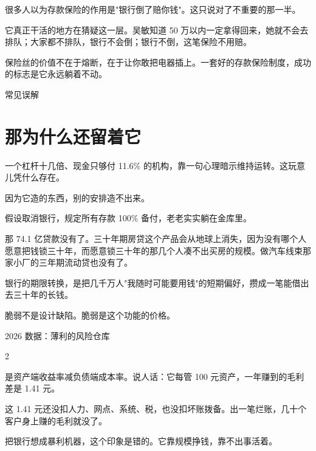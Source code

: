 很多人以为存款保险的作用是"银行倒了赔你钱"。这只说对了不重要的那一半。

它真正干活的地方在猜疑这一层。吴敏知道 50 万以内一定拿得回来，她就不会去排队；大家都不排队，银行不会倒；银行不倒，这笔保险不用赔。

保险丝的价值不在于熔断，在于让你敢把电器插上。一套好的存款保险制度，成功的标志是它永远躺着不动。

\begin{mythbox}{常见误解}
\end{mythbox}

\section{那为什么还留着它}

一个杠杆十几倍、现金只够付 11.6\% 的机构，靠一句心理暗示维持运转。这玩意儿凭什么存在。

因为它造的东西，别的安排造不出来。

假设取消银行，规定所有存款 100\% 备付，老老实实躺在金库里。

那 74.1 亿贷款没有了。三十年期房贷这个产品会从地球上消失，因为没有哪个人愿意把钱锁三十年，而愿意锁三十年的那几个人凑不出买房的规模。做汽车线束那家小厂的三年期流动贷也没有了。

银行的期限转换，是把几千万人"我随时可能要用钱"的短期偏好，攒成一笔能借出去三十年的长钱。

脆弱不是设计缺陷。脆弱是这个功能的价格。

\begin{databox}{2026 数据：薄利的风险仓库}

\begin{statrow}{2}
\end{statrow}

是资产端收益率减负债端成本率。说人话：它每管 100 元资产，一年赚到的毛利差是 1.41 元。

这 1.41 元还没扣人力、网点、系统、税，也没扣坏账拨备。出一笔烂账，几十个客户身上赚的毛利就没了。

把银行想成暴利机器，这个印象是错的。它靠规模挣钱，靠不出事活着。

\end{databox}

